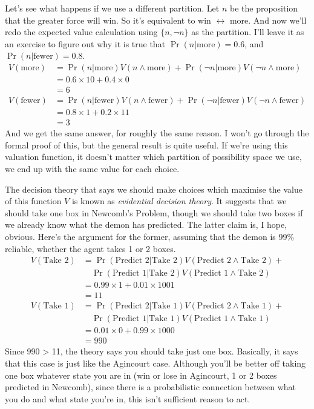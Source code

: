 Let's see what happens if we use a different partition. Let $n$ be the proposition that the greater force will win. So it's equivalent to win $\leftrightarrow$ more. And now we'll redo the expected value calculation using $\{n, \neg n\}$ as the partition. I'll leave it as an exercise to figure out why it is true that $\Pr(n | \text{more}) = 0.6$, and $\Pr(n | \text{fewer}) = 0.8$.
\begin{align*}
V(\text{more}) &= \Pr(n | \text{more}) V(n \wedge \text{more}) +  \Pr(\neg n | \text{more}) V(\neg n\wedge \text{more}) \\
&= 0.6 \times 10 + 0.4 \times 0 \\
&= 6 \\
V(\text{fewer}) &= \Pr(n | \text{fewer}) V(n \wedge \text{fewer}) +  \Pr(\neg n | \text{fewer}) V(\neg n \wedge \text{fewer}) \\
&= 0.8 \times 1 + 0.2 \times 11 \\
&= 3
\end{align*} 
\noindent And we get the same answer, for roughly the same reason. I won't go through the formal proof of this, but the general result is quite useful. If we're using this valuation function, it doesn't matter which partition of possibility space we use, we end up with the same value for each choice.

The decision theory that says we should make choices which maximise the value of this function $V$ is known as \textit{evidential decision theory}. It suggests that we should take one box in Newcomb's Problem, though we should take two boxes if we already know what the demon has predicted. The latter claim is, I hope, obvious. Here's the argument for the former, assuming that the demon is 99\% reliable, whether the agent takes 1 or 2 boxes.
\begin{align*}
V(\text{Take 2}) &= \Pr(\text{Predict 2} | \text{Take 2}) V (\text{Predict 2} \wedge \text{Take 2}) + \\
 & \hspace{12pt} \Pr(\text{Predict 1} | \text{Take 2}) V (\text{Predict 1} \wedge \text{Take 2}) \\
&= 0.99 \times 1 + 0.01 \times 1001 \\
&= 11 \\
V(\text{Take 1}) &= \Pr(\text{Predict 2} | \text{Take 1}) V (\text{Predict 2} \wedge \text{Take 1}) + \\
 & \hspace{12pt} \Pr(\text{Predict 1} | \text{Take 1}) V (\text{Predict 1} \wedge \text{Take 1}) \\
&= 0.01 \times 0 + 0.99 \times 1000 \\
&= 990 
\end{align*} 
\noindent Since 990 > 11, the theory says you should take just one box. Basically, it says that this case is just like the Agincourt case. Although you'll be better off taking one box whatever state you are in (win or lose in Agincourt, 1 or 2 boxes predicted in Newcomb), since there is a probabilistic connection between what you do and what state you're in, this isn't sufficient reason to act.

